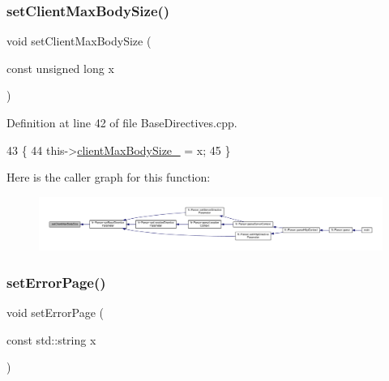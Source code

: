 \subsubsection{\texorpdfstring{set\+Client\+Max\+Body\+Size()}{setClientMaxBodySize()}}
{\footnotesize\ttfamily void set\+Client\+Max\+Body\+Size (\begin{DoxyParamCaption}\item[{const unsigned long}]{x }\end{DoxyParamCaption})\hspace{0.3cm}{\ttfamily [inherited]}}



Definition at line 42 of file Base\+Directives.\+cpp.


\begin{DoxyCode}
43     \{
44         this->\hyperlink{classft_1_1_base_directives_ad65c2594d2a90ca065d410dfd4066a19}{clientMaxBodySize\_} = x;
45     \}
\end{DoxyCode}
Here is the caller graph for this function\+:
\nopagebreak
\begin{figure}[H]
\begin{center}
\leavevmode
\includegraphics[width=350pt]{classft_1_1_base_directives_a39bf4922f3236043c76beaffaa557a3b_icgraph}
\end{center}
\end{figure}
\mbox{\label{classft_1_1_base_directives_a505ecc88b3e1779583ad60cc243c7769}} 
\subsubsection{\texorpdfstring{set\+Error\+Page()}{setErrorPage()}}
{\footnotesize\ttfamily void set\+Error\+Page (\begin{DoxyParamCaption}\item[{const std\+::string}]{x }\end{DoxyParamCaption})\hspace{0.3cm}{\ttfamily [inherited]}}




